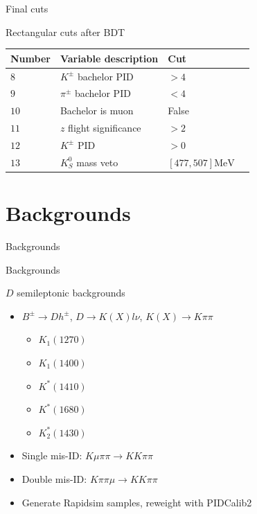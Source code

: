 \documentclass{beamer}
\begin{document}
\begin{frame}{Final cuts}
  \begin{center}
    Rectangular cuts after BDT
  \end{center}
  \centering
  \def\arraystretch{1.2}%
  \begin{tabular}{lllc} 
    \hline
    Number & Variable description     & Cut \\
    \hline
    $8$    & $K^\pm$ bachelor PID     & $> 4$ \\
    $9$    & $\pi^\pm$ bachelor PID   & $< 4$ \\
    $10$   & Bachelor is muon         & False \\
    $11$   & $z$ flight significance  & $> 2$ \\
    $12$   & $K^\pm$ PID              & $> 0$ \\
    $13$   & $K_S^0$ mass veto        & $[477, 507]\si{\mega\eV}$ \\
    \hline
  \end{tabular}
\end{frame}

\section{Backgrounds}
\begin{frame}{Backgrounds}
  \begin{center}
    {\huge Backgrounds}
  \end{center}
\end{frame}

\begin{frame}{$D$ semileptonic backgrounds}
  \begin{itemize}
    \setlength\itemsep{1em}
    \item{$B^\pm\to Dh^\pm$, $D\to K(X)l\nu$, $K(X)\to K\pi\pi$}
    \begin{itemize}
      \item{$K_1(1270)$}
      \item{$K_1(1400)$}
      \item{$K^*(1410)$}
      \item{$K^*(1680)$}
      \item{$K_2^*(1430)$}
    \end{itemize}
    \item{Single mis-ID: $K\mu\pi\pi\to KK\pi\pi$}
    \item{Double mis-ID: $K\pi\pi\mu\to KK\pi\pi$}
    \item{Generate Rapidsim samples, reweight with PIDCalib2}
  \end{itemize}
\end{frame}
\end{document}
